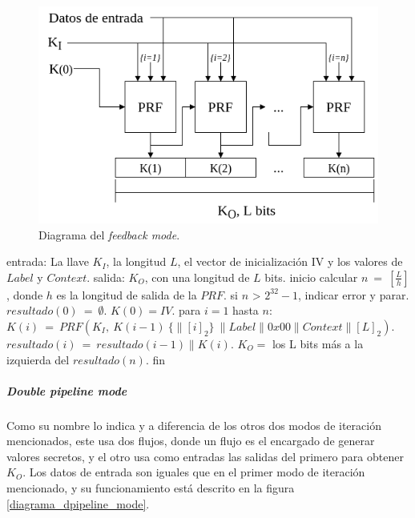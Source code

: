 \begin{figure}
  \begin{center}
    \includegraphics[width=0.75\linewidth]{diagramas/feedback_mode}
    \caption{Diagrama del \textit{feedback mode}.}
    \label{diagrama_feedback_mode}
   \end{center}
\end{figure}

\begin{pseudocodigo}[caption={Funcionamiento del \textit{feedback mode}.},
label={mi:2}]
    entrada:   La llave $K_I$, la longitud $L$, el vector de inicialización IV
               y los valores de $Label$ y $Context$.
    salida:    $K_O$, con una longitud de $L$ bits.
    inicio
      calcular $n\: =\: [\frac{L}{h}]$, donde $h$ es la longitud de salida de la $PRF$.
      si $n$ > $2^{32}-1$, indicar error y parar.
      $resultado(0)\: =\: \emptyset$.
      $K(0) = IV$.
      para $i=1$ hasta $n$:
        $K(i)\: = \:PRF(K_I,\: K(i-1)\: \{\parallel {[i]}_2\}\: \parallel Label \parallel 0x00 \parallel Context \parallel {[L]}_2 )$.
        $resultado(i)\: =\: resultado(i-1) \parallel K(i)$.
      $K_O =$ los L bits más a la izquierda del $resultado(n)$.
    fin
\end{pseudocodigo}

\subparagraph{Double pipeline mode}
Como su nombre lo indica y a diferencia de los otros dos modos de iteración
mencionados, este usa dos flujos, donde un flujo es el encargado de generar
valores secretos, y el otro usa como entradas las salidas del primero para
obtener $K_O$. Los datos de entrada son iguales que en el primer modo de
iteración mencionado, y su funcionamiento está descrito en la figura
\ref{diagrama_dpipeline_mode}.

